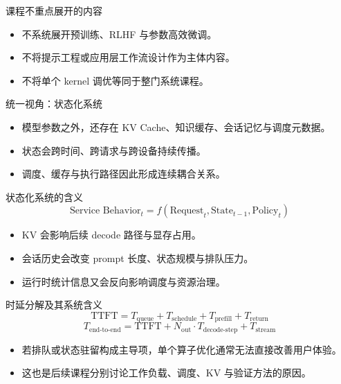 \begin{frame}{课程不重点展开的内容}
  \begin{itemize}
    \item 不系统展开预训练、RLHF 与参数高效微调。
    \item 不将提示工程或应用层工作流设计作为主体内容。
    \item 不将单个 kernel 调优等同于整门系统课程。
  \end{itemize}
\end{frame}

\begin{frame}{统一视角：状态化系统}
  \begin{itemize}
    \item 模型参数之外，还存在 KV Cache、知识缓存、会话记忆与调度元数据。
    \item 状态会跨时间、跨请求与跨设备持续传播。
    \item 调度、缓存与执行路径因此形成连续耦合关系。
  \end{itemize}
\end{frame}

\begin{frame}{状态化系统的含义}
  \[
    \text{Service Behavior}_t = f(\text{Request}_t, \text{State}_{t-1}, \text{Policy}_t)
  \]
  \begin{itemize}
    \item KV 会影响后续 decode 路径与显存占用。
    \item 会话历史会改变 prompt 长度、状态规模与排队压力。
    \item 运行时统计信息又会反向影响调度与资源治理。
  \end{itemize}
\end{frame}

\begin{frame}{时延分解及其系统含义}
  \[
    \text{TTFT} = T_{\text{queue}} + T_{\text{schedule}} + T_{\text{prefill}} + T_{\text{return}}
  \]
  \[
    T_{\text{end-to-end}} = \text{TTFT} + N_{\text{out}} \cdot T_{\text{decode-step}} + T_{\text{stream}}
  \]
  \begin{itemize}
    \item 若排队或状态驻留构成主导项，单个算子优化通常无法直接改善用户体验。
    \item 这也是后续课程分别讨论工作负载、调度、KV 与验证方法的原因。
  \end{itemize}
\end{frame}

